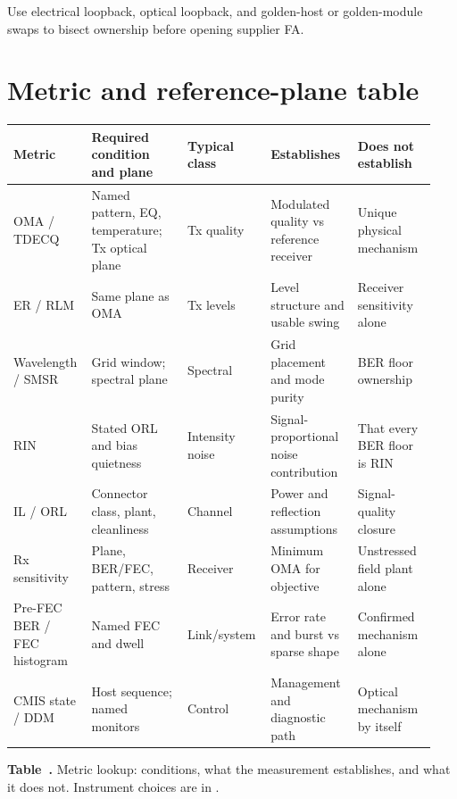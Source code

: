 Use electrical loopback, optical loopback, and golden-host or golden-module
swaps to bisect ownership before opening supplier FA.

\section{Metric and reference-plane table}
\label{sec:measurement-mapping}

\begin{table}[ht]
\label{tab:measurement-mapping}%
\centering
\setlength{\tabcolsep}{3pt}%
\footnotesize
\renewcommand{\arraystretch}{1.2}%
\begin{tabular}{@{}p{0.16\linewidth}p{0.22\linewidth}p{0.18\linewidth}p{0.20\linewidth}p{0.18\linewidth}@{}}
\toprule
Metric & Required condition and plane & Typical class & Establishes & Does not establish \\
\midrule
OMA / TDECQ & Named pattern, EQ, temperature; Tx optical plane & Tx quality &
Modulated quality vs reference receiver & Unique physical mechanism \\
\addlinespace[0.6em]
ER / RLM & Same plane as OMA & Tx levels & Level structure and usable swing &
Receiver sensitivity alone \\
\addlinespace[0.6em]
Wavelength / SMSR & Grid window; spectral plane & Spectral & Grid placement and
mode purity & BER floor ownership \\
\addlinespace[0.6em]
RIN & Stated ORL and bias quietness & Intensity noise & Signal-proportional
noise contribution & That every BER floor is RIN \\
\addlinespace[0.6em]
IL / ORL & Connector class, plant, cleanliness & Channel & Power and reflection
assumptions & Signal-quality closure \\
\addlinespace[0.6em]
Rx sensitivity & Plane, BER/FEC, pattern, stress & Receiver & Minimum OMA for
objective & Unstressed field plant alone \\
\addlinespace[0.6em]
Pre-FEC BER / FEC histogram & Named FEC and dwell & Link/system & Error rate and
burst vs sparse shape & Confirmed mechanism alone \\
\addlinespace[0.6em]
CMIS state / DDM & Host sequence; named monitors & Control & Management and
diagnostic path & Optical mechanism by itself \\
\bottomrule
\end{tabular}
\par\medskip
{\raggedright\footnotesize\textbf{Table~\thetable.} Metric lookup: conditions,
what the measurement establishes, and what it does not. Instrument choices are
in .\par}
\end{table}

